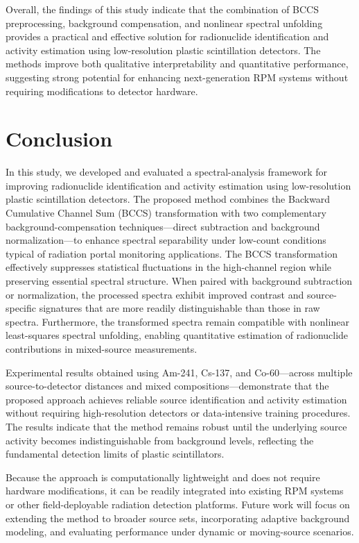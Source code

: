 \documentclass[10pt]{wlscirep}
\begin{document}
Overall, the findings of this study indicate that the combination of BCCS preprocessing, background compensation, and nonlinear spectral unfolding provides a practical and effective solution for radionuclide identification and activity estimation using low-resolution plastic scintillation detectors. The methods improve both qualitative interpretability and quantitative performance, suggesting strong potential for enhancing next-generation RPM systems without requiring modifications to detector hardware.

\section*{Conclusion}

In this study, we developed and evaluated a spectral-analysis framework for improving radionuclide identification and activity estimation using low-resolution plastic scintillation detectors. The proposed method combines the Backward Cumulative Channel Sum (BCCS) transformation with two complementary background-compensation techniques—direct subtraction and background normalization—to enhance spectral separability under low-count conditions typical of radiation portal monitoring applications.
The BCCS transformation effectively suppresses statistical fluctuations in the high-channel region while preserving essential spectral structure. When paired with background subtraction or normalization, the processed spectra exhibit improved contrast and source-specific signatures that are more readily distinguishable than those in raw spectra. Furthermore, the transformed spectra remain compatible with nonlinear least-squares spectral unfolding, enabling quantitative estimation of radionuclide contributions in mixed-source measurements.

Experimental results obtained using Am-241, Cs-137, and Co-60—across multiple source-to-detector distances and mixed compositions—demonstrate that the proposed approach achieves reliable source identification and activity estimation without requiring high-resolution detectors or data-intensive training procedures. The results indicate that the method remains robust until the underlying source activity becomes indistinguishable from background levels, reflecting the fundamental detection limits of plastic scintillators.

Because the approach is computationally lightweight and does not require hardware modifications, it can be readily integrated into existing RPM systems or other field-deployable radiation detection platforms. Future work will focus on extending the method to broader source sets, incorporating adaptive background modeling, and evaluating performance under dynamic or moving-source scenarios.
\end{document}
